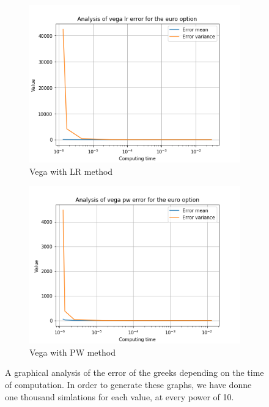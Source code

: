 \documentclass[12pt,a4paper,fleqn]{article}
\begin{document}
\begin{figure}
      \begin{subfigure}[b]{0.45\textwidth}
          \includegraphics[width=\textwidth]{graphs/eurovegalrtime.png}
          \caption{Vega with LR method}
      \end{subfigure}
      \begin{subfigure}[b]{0.45\textwidth}
          \includegraphics[width=\textwidth]{graphs/eurovegapwtime.png}
          \caption{Vega with PW method}
      \end{subfigure}

      \caption{\label{fig:eurographs}A graphical analysis of the error of the greeks depending on the time of computation. In order to generate these graphs, we have donne one thousand simlations for each value, at every power of 10.}
\end{figure}
\end{document}
